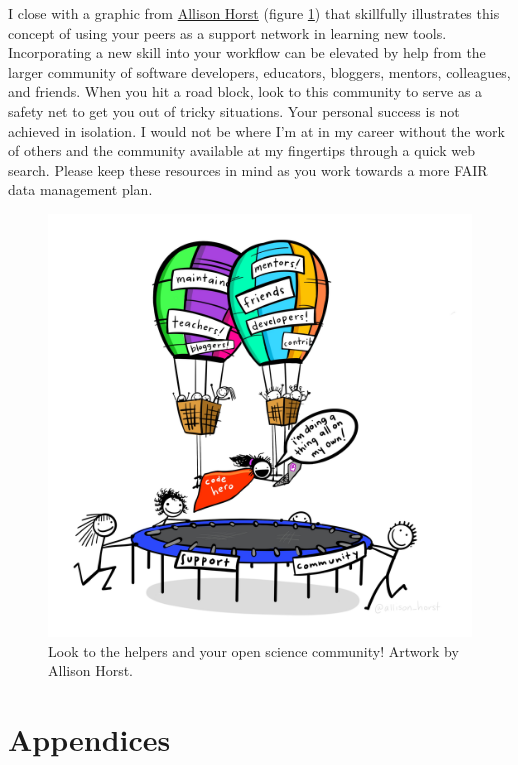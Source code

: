 \documentclass[
]{book}
\begin{document}
I close with a graphic from \href{https://twitter.com/allison_horst}{Allison Horst} (figure \ref{fig:codehero}) that skillfully illustrates this concept of using your peers as a support network in learning new tools. Incorporating a new skill into your workflow can be elevated by help from the larger community of software developers, educators, bloggers, mentors, colleagues, and friends. When you hit a road block, look to this community to serve as a safety net to get you out of tricky situations. Your personal success is not achieved in isolation. I would not be where I'm at in my career without the work of others and the community available at my fingertips through a quick web search. Please keep these resources in mind as you work towards a more FAIR data management plan.

\begin{figure}

{\centering \includegraphics[width=1\linewidth]{img/code_hero} 

}

\caption{Look to the helpers and your open science community! Artwork by Allison Horst.}\label{fig:codehero}
\end{figure}

\hypertarget{appendices}{%
\chapter{Appendices}\label{appendices}}
\end{document}
